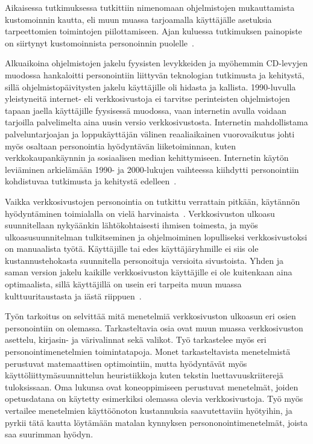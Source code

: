 \documentclass[finnish, 12pt, a4paper, elec, utf8, a-1b, online]{aaltothesis}
\begin{document}
Aikaisessa tutkimuksessa tutkittiin nimenomaan ohjelmistojen mukauttamista
kustomoinnin kautta, eli muun muassa tarjoamalla käyttäjälle asetuksia
tarpeettomien toimintojen piilottamiseen. Ajan kuluessa tutkimuksen painopiste
on siirtynyt kustomoinnista personoinnin puolelle~\cite{viite?}.

Alkuaikoina ohjelmistojen jakelu fyysisten levykkeiden ja myöhemmin CD-levyjen
muodossa hankaloitti personointiin liittyvän teknologian tutkimusta ja
kehitystä, sillä ohjelmistopäivitysten jakelu käyttäjille oli hidasta ja
kallista. 1990-luvulla yleistyneitä internet- eli verkkosivustoja ei tarvitse
perinteisten ohjelmistojen tapaan jaella käyttäjille fyysisessä muodossa, vaan
internetin avulla voidaan tarjoilla palvelimelta aina uusin versio
verkkosivustosta. Internetin mahdollistama palveluntarjoajan ja loppukäyttäjän
välinen reaaliaikainen vuorovaikutus johti myös osaltaan personointia
hyödyntävän liiketoiminnan, kuten verkkokaupankäynnin ja sosiaalisen median
kehittymiseen. Internetin käytön leviäminen arkielämään 1990- ja 2000-lukujen
vaihteessa kiihdytti personointiin kohdistuvaa tutkimusta ja
kehitystä edelleen~\cite{10.1108/03090560710737534}.

Vaikka verkkosivustojen personointia on tutkittu verrattain pitkään, käytännön
hyödyntäminen toimialalla on vielä harvinaista~\cite{viite?}.
Verkkosivuston ulkoasu suunnitellaan nykyäänkin lähtökohtaisesti ihmisen toimesta,
ja myös ulkoasusuunnitelman tulkitseminen ja ohjelmoiminen lopulliseksi
verkkosivustoksi on manuaalista työtä. Käyttäjille tai edes käyttäjäryhmille ei
siis ole kustannustehokasta suunnitella personoituja versioita sivustoista.
Yhden ja saman version jakelu kaikille verkkosivuston käyttäjille ei ole
kuitenkaan aina optimaalista, sillä käyttäjillä on usein eri tarpeita muun
muassa kulttuuritaustasta ja iästä riippuen~\cite{viite?}.

Työn tarkoitus on selvittää mitä menetelmiä verkkosivuston ulkoasun eri osien
personointiin on olemassa. Tarkasteltavia osia ovat muun muassa verkkosivuston
asettelu, kirjasin- ja värivalinnat sekä valikot. Työ tarkastelee myös eri
personointimenetelmien toimintatapoja. Monet tarkasteltavista menetelmistä
perustuvat matemaattisen optimointiin, mutta hyödyntävät myös
käyttöliittymäsuunnittelun heuristiikkoja kuten tekstin luettavuuskriiterejä
tuloksissaan. Oma lukunsa ovat koneoppimiseen perustuvat menetelmät, joiden
opetusdatana on käytetty esimerkiksi olemassa olevia verkkosivustoja. Työ myös
vertailee menetelmien käyttöönoton kustannuksia saavutettaviin hyötyihin, ja
pyrkii tätä kautta löytämään matalan kynnyksen persononointimenetelmät, joista
saa suurimman hyödyn.
\end{document}
